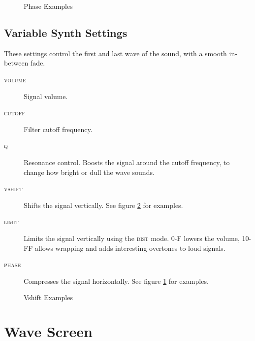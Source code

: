 \begin{figure}[hbtp]
	\centering
	\qquad

	\qquad
	\caption{Phase Examples}
	\label{fig:phasing}
\end{figure}

\subsection{Variable Synth Settings}

These settings control the first and last wave of the sound, with a smooth in-between fade.

\begin{description}
\item[\textsc{volume}] Signal volume.
\item[\textsc{cutoff}] Filter cutoff frequency.
\item[\textsc{q}] Resonance control. Boosts the signal around the cutoff frequency, to change how bright or dull the wave sounds.
\item[\textsc{vshift}] Shifts the signal vertically. See figure \ref{fig:vshift} for examples.
\item[\textsc{limit}] Limits the signal vertically using the \textsc{dist} mode. 0-F lowers the volume, 10-FF allows wrapping and adds interesting overtones to loud signals.
\item[\textsc{phase}] Compresses the signal horizontally. See figure \ref{fig:phasing} for examples.
\end{description}

\begin{figure}[htpb]
	\centering


	\caption{Vshift Examples}
	\label{fig:vshift}
\end{figure}

\section{Wave Screen}
\label{wave-screen-section}

